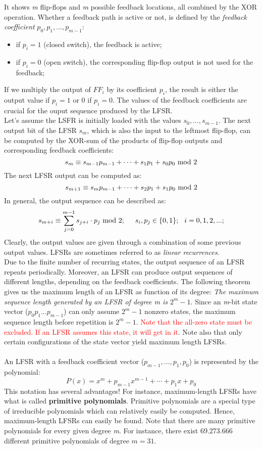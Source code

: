 It shows \textit{m} flip-flops and \textit{m} possible feedback locations, all combined by the XOR operation. Whether a feedback path is active or not, is defined by the \textit{feedback coefficient} $p_0,p_1,...,p_{m-1}$:
\begin{itemize}
    \item if $p_i=1$ (closed switch), the feedback is active;
    \item if $p_i=0$ (open switch), the corresponding flip-flop output is not used for the feedback;
\end{itemize}
If we multiply the output of $FF_i$ by its coefficient $p_i$, the result is either the output value if $p_i=1$ or 0 if $p_i=0$. The values of the feedback coefficients are crucial for the ouput sequence produced by the LFSR.\\

Let's assume the LSFR is initially loaded with the values $s_0,...,s_{m-1}$. The next output bit of the LFSR $s_m$, which is also the input to the leftmost flip-flop, can be computed by the XOR-sum of the products of flip-flop outputs and corresponding feedback coefficients:
$$s_m\equiv s_{m-1}p_{m-1}+\cdots+s_1p_1+s_0p_0\text{ mod } 2$$
The next LFSR output can be computed as:
$$s_{m+1}\equiv s_mp_{m-1}+\cdots+s_2p_1+s_1p_0\text{ mod } 2$$
In general, the output sequence can be described as:
$$s_{m+i}\equiv\displaystyle\sum_{j=0}^{m-1}s_{j+i}\cdot p_j\text{ mod } 2;\hspace{0.5cm}s_i,p_j\in\{0,1\};\hspace{0.25cm}i=0,1,2,...;$$
Clearly, the output values are given through a combination of some previous output values. LFSRs are sometimes referred to as \textit{linear recurrences}.\\

Due to the finite number of recurring states, the output sequence of an LFSR repeats periodically. Moreover, an LFSR can produce output sequences of different lengths, depending on the feedback coefficients. The following theorem gives us the maximum length of an LFSR as function of its degree:
\textit{The maximum sequence length generated by an LFSR of degree \textit{m} is $2^m-1$}. Since an \textit{m}-bit state vector ($p_0p_1...p_{m-1}$) can only assume $2^m-1$ nonzero states, the maximum sequence length before repetition is $2^m-1$. \textcolor{red}{Note that the all-zero state must be excluded. If an LFSR assumes this state, it will get  in it}. Note also that only certain configurations of the state vector yield maximum length LFSRs.\\\\
An LFSR with a feedback coefficient vector ($p_{m-1},...,p_1,p_0$) is represented by the polynomial:
$$P(x)=x^m+p_{m-1}x^{m-1}+\cdots+p_1x+p_0$$
This notation has several advantages! For instance, maximum-length LFSRs have what is called \textbf{primitive polynomials}. Primitive polynomials are a special type of irreducible polynomials which can relatively easily be computed. Hence, maximum-length LFSRs can easily be found. Note that there are many primitive polynomials for every given degree \textit{m}. For instance, there exist 69.273.666 different primitive polynomials of degree $m=31$.


